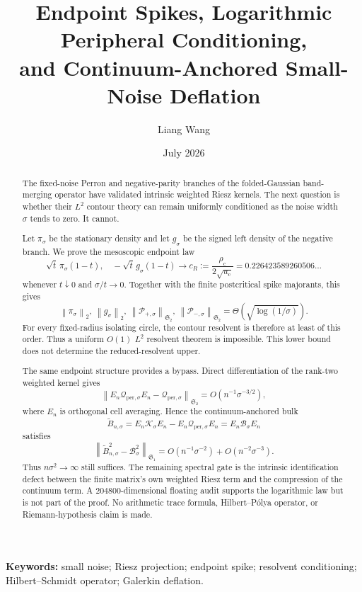 \documentclass[11pt]{article}
\title{Endpoint Spikes, Logarithmic Peripheral Conditioning,\\
and Continuum-Anchored Small-Noise Deflation}
\author{Liang Wang}
\date{July 2026}
\theoremstyle{remark}
\newcommand{\cK}{\mathcal K}
\newcommand{\cB}{\mathcal B}
\newcommand{\cQ}{\mathcal Q}
\newcommand{\cP}{\mathcal P}
\newcommand{\norm}[1]{\left\lVert#1\right\rVert}
\newcommand{\HS}{\mathfrak S_2}
\newcommand{\TC}{\mathfrak S_1}
\begin{document}
\maketitle

\begin{abstract}
The fixed-noise Perron and negative-parity branches of the folded-Gaussian
band-merging operator have validated intrinsic weighted Riesz kernels.  The
next question is whether their $L^2$ contour theory can remain uniformly
conditioned as the noise width $\sigma$ tends to zero.  It cannot.

Let $\pi_\sigma$ be the stationary density and let $g_\sigma$ be the signed
left density of the negative branch.  We prove the mesoscopic endpoint law
\[
 \sqrt t\,\pi_\sigma(1-t),
 \quad -\sqrt t\,g_\sigma(1-t)
 \longrightarrow
 c_R:=\frac{\rho_{\mathrm c}}{2\sqrt{u_{\mathrm c}}}
 =0.226423589260506\ldots
\]
whenever $t\downarrow0$ and $\sigma/t\to0$.  Together with the finite
postcritical spike majorants, this gives
\[
 \norm{\pi_\sigma}_2,\ \norm{g_\sigma}_2,\
 \norm{\cP_{+,\sigma}}_{\HS},\
 \norm{\cP_{-,\sigma}}_{\HS}
 =\Theta\!\left(\sqrt{\log(1/\sigma)}\right).
\]
For every fixed-radius isolating circle, the contour resolvent is therefore
at least of this order.  Thus a uniform $O(1)$ $L^2$ resolvent theorem is
impossible.  This lower bound does not determine the reduced-resolvent upper.

The same endpoint structure provides a bypass.  Direct differentiation of
the rank-two weighted kernel gives
\[
 \norm{E_n\cQ_{\mathrm{per},\sigma}E_n
       -\cQ_{\mathrm{per},\sigma}}_{\HS}
 =O(n^{-1}\sigma^{-3/2}),
\]
where $E_n$ is orthogonal cell averaging.  Hence the continuum-anchored bulk
\[
 \widetilde B_{n,\sigma}
 =E_n\cK_\sigma E_n-E_n\cQ_{\mathrm{per},\sigma}E_n
 =E_n\cB_\sigma E_n
\]
satisfies
\[
 \norm{\widetilde B_{n,\sigma}^2-\cB_\sigma^2}_{\TC}
 =O(n^{-1}\sigma^{-2})+O(n^{-2}\sigma^{-3}).
\]
Thus $n\sigma^2\to\infty$ still suffices.  The remaining spectral gate is the
intrinsic identification defect between the finite matrix's own weighted
Riesz term and the compression of the continuum term.  A
$204800$-dimensional floating audit supports the logarithmic law but is not
part of the proof.  No arithmetic trace formula, Hilbert--P\'olya operator,
or Riemann-hypothesis claim is made.
\end{abstract}

\noindent\textbf{Keywords:} small noise; Riesz projection; endpoint spike;
resolvent conditioning; Hilbert--Schmidt operator; Galerkin deflation.
\end{document}
